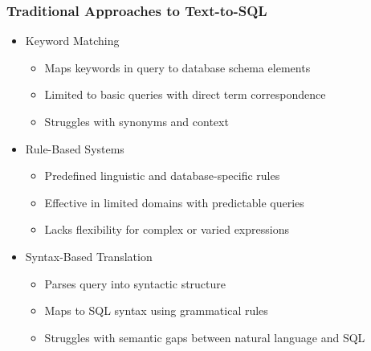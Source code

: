 \begin{frame}\frametitle{Traditional Approaches to Text-to-SQL}
      \begin{itemize}
        \item Keyword Matching
          \begin{itemize}
            \item Maps keywords in query to database schema elements
            \item Limited to basic queries with direct term correspondence
            \item Struggles with synonyms and context
          \end{itemize}
        \item Rule-Based Systems
          \begin{itemize}
            \item Predefined linguistic and database-specific rules
            \item Effective in limited domains with predictable queries
            \item Lacks flexibility for complex or varied expressions
          \end{itemize}
        \item Syntax-Based Translation
          \begin{itemize}
            \item Parses query into syntactic structure
            \item Maps to SQL syntax using grammatical rules
            \item Struggles with semantic gaps between natural language and SQL
          \end{itemize}
      \end{itemize}
\end{frame}

